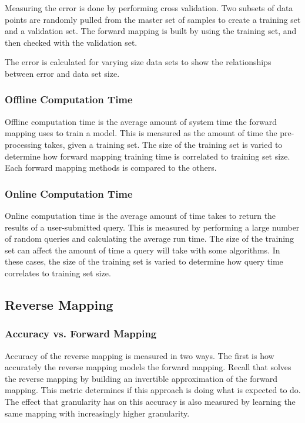 Measuring the error is done by performing cross validation.
Two subsets of data points are randomly pulled from the master set of samples to create a training set and a validation set.
The forward mapping is built by using the training set, and then checked with the validation set.

The error is calculated for varying size data sets to show the relationships between error and data set size.

  \subsubsection{Offline Computation Time}

Offline computation time is the average amount of system time the forward mapping uses to train a model.
This is measured as the amount of time the pre-processing takes, given a training set.
The size of the training set is varied to determine how forward mapping training time is correlated to training set size.
Each forward mapping methods is compared to the others.

  \subsubsection{Online Computation Time}

Online computation time is the average amount of time \fw takes to return the results of a user-submitted query.
This is measured by performing a large number of random queries and calculating the average run time.
The size of the training set can affect the amount of time a query will take with some algorithms.
In these cases, the size of the training set is varied to determine how query time correlates to training set size.

 \subsection{Reverse Mapping}

  \subsubsection{Accuracy vs. Forward Mapping}
Accuracy of the reverse mapping is measured in two ways.
The first is how accurately the reverse mapping models the forward mapping.
Recall that \fw solves the reverse mapping by building an invertible approximation of the forward mapping.
This metric determines if this approach is doing what is expected to do.
The effect that granularity has on this accuracy is also measured by learning the same mapping with increasingly higher granularity.

